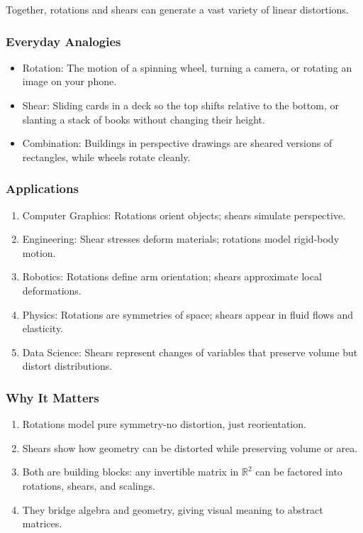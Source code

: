 \documentclass[
  letterpaper,
  DIV=11,
  numbers=noendperiod]{scrreprt}
\providecommand{\tightlist}{%
  \setlength{\itemsep}{0pt}\setlength{\parskip}{0pt}}
\begin{document}
Together, rotations and shears can generate a vast variety of linear
distortions.

\subsubsection{Everyday Analogies}\label{everyday-analogies-44}

\begin{itemize}
\tightlist
\item
  Rotation: The motion of a spinning wheel, turning a camera, or
  rotating an image on your phone.
\item
  Shear: Sliding cards in a deck so the top shifts relative to the
  bottom, or slanting a stack of books without changing their height.
\item
  Combination: Buildings in perspective drawings are sheared versions of
  rectangles, while wheels rotate cleanly.
\end{itemize}

\subsubsection{Applications}\label{applications-11}

\begin{enumerate}
\def\labelenumi{\arabic{enumi}.}
\tightlist
\item
  Computer Graphics: Rotations orient objects; shears simulate
  perspective.
\item
  Engineering: Shear stresses deform materials; rotations model
  rigid-body motion.
\item
  Robotics: Rotations define arm orientation; shears approximate local
  deformations.
\item
  Physics: Rotations are symmetries of space; shears appear in fluid
  flows and elasticity.
\item
  Data Science: Shears represent changes of variables that preserve
  volume but distort distributions.
\end{enumerate}

\subsubsection{Why It Matters}\label{why-it-matters-44}

\begin{enumerate}
\def\labelenumi{\arabic{enumi}.}
\tightlist
\item
  Rotations model pure symmetry-no distortion, just reorientation.
\item
  Shears show how geometry can be distorted while preserving volume or
  area.
\item
  Both are building blocks: any invertible matrix in \(\mathbb{R}^2\)
  can be factored into rotations, shears, and scalings.
\item
  They bridge algebra and geometry, giving visual meaning to abstract
  matrices.
\end{enumerate}
\end{document}
